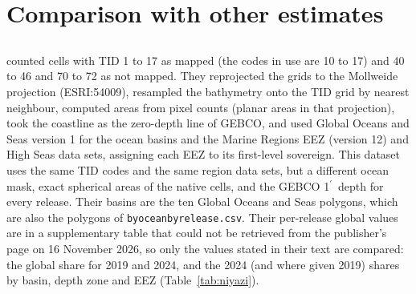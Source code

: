 \documentclass[essd, manuscript]{copernicus}
\newcommand{\am}{$^{\prime}$}            %
\renewcommand{\_}{\usorig\allowbreak}
\begin{document}
\section{Comparison with other estimates}
\label{sec:comparison}

\subsection{\citet{niyazi2025}}

\citet{niyazi2025} counted cells with TID 1 to 17 as mapped (the codes in use are 10 to 17) and 40 to 46 and 70 to 72 as not mapped.
They reprojected the grids to the Mollweide projection (ESRI:54009), resampled the bathymetry onto the TID grid by nearest neighbour, computed areas from pixel counts (planar areas in that projection), took the coastline as the zero-depth line of GEBCO\_2024, and used Global Oceans and Seas version 1 for the ocean basins and the Marine Regions EEZ (version 12) and High Seas data sets, assigning each EEZ to its first-level sovereign.
This dataset uses the same TID codes and the same region data sets, but a different ocean mask, exact spherical areas of the native cells, and the GEBCO\_2026 1\am\ depth for every release.
Their basins are the ten Global Oceans and Seas polygons, which are also the polygons of \texttt{by\_ocean\_by\_release.csv}.
Their per-release global values are in a supplementary table that could not be retrieved from the publisher's page on 16 November 2026, so only the values stated in their text are compared: the global share for 2019 and 2024, and the 2024 (and where given 2019) shares by basin, depth zone and EEZ (Table~\ref{tab:niyazi}).
\end{document}
